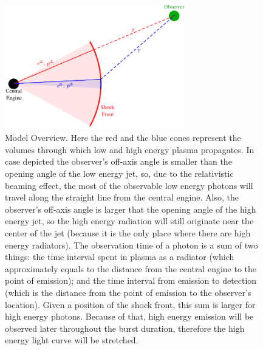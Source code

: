 \documentclass{article}
\begin{document}
\begin{figure}
        \centering
        \includegraphics[width=0.7\textwidth]{modelOverview}
        \caption{
        	Model Overview. Here the red and the blue cones represent the volumes through which low and high energy plasma propagates. In case depicted the observer's off-axis angle is smaller than the opening angle of the low energy jet, so, due to the relativistic beaming effect, the most of the observable low energy photons will travel along the straight line from the central engine. Also, the observer's off-axis angle is larger that the opening angle of the high energy jet, so the high energy radiation will still originate near the center of the jet (because it is the only place where there are high energy radiators). The observation time of a photon is a sum of two things: the time interval spent in plasma as a radiator (which approximately equals to the distance from the central engine to the point of emission); and the time interval from emission to detection (which is the distance from the point of emission to the observer's location). Given a position of the shock front, this sum is larger for high energy photons. Because of that, high energy emission will be observed later throughout the burst duration, therefore the high energy light curve will be stretched.
        }
        \label{fig:modelOverview}
\end{figure}
\end{document}

